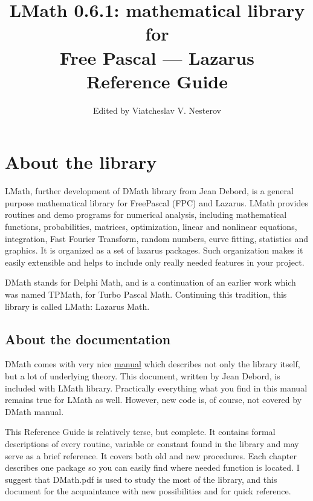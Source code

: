 \documentclass[12pt,a4paper,oneside]{report}
\begin{document}
\title{LMath 0.6.1: mathematical library for\\ Free Pascal --- Lazarus\\
{\Large Reference Guide}}

\author{Edited by Viatcheslav V. Nesterov}
\maketitle
\newpage
\label{toc}\tableofcontents
\newpage
\newlength{\tmplength}


\chapter{About the library}
LMath, further development of DMath library from Jean Debord, is a general purpose mathematical library for FreePascal (FPC) and Lazarus. LMath provides routines and demo programs for numerical analysis, including
mathematical functions, probabilities, matrices, optimization, linear and
nonlinear equations, integration, Fast Fourier Transform, random numbers,
curve fitting, statistics and graphics.
It is organized as a set of lazarus packages. Such organization makes it easily extensible and helps to include only really needed features in your project.

DMath stands for Delphi Math, and is a continuation of an earlier work which was named TPMath, for Turbo Pascal Math. Continuing this tradition, this library is called LMath: Lazarus Math.
\section*{About the documentation} 
DMath comes with very nice \href{DMath.pdf}{manual} which describes not only the library itself, but a lot of underlying theory. This document, written by Jean Debord, is included with LMath library. Practically everything what you find in this manual remains true for LMath as well. However, new code is, of course, not covered by DMath manual. 

This Reference Guide is relatively terse, but complete. It contains formal descriptions of every routine, variable or constant found in the library and may serve as a brief reference. It covers both old and new procedures. Each chapter describes one package so you can easily find where needed function is located. I suggest that DMath.pdf is used to study the most of the library, and this document for the acquaintance with new possibilities and for quick reference.
\end{document}
